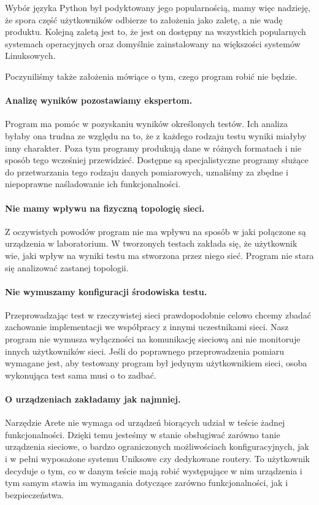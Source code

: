 \documentclass[00-praca-magisterska.tex]{subfiles}
\begin{document}
Wybór języka Python był podyktowany jego popularnością, mamy więc nadzieję, że
spora część użytkowników odbierze to założenia jako zaletę, a nie wadę
produktu. Kolejną zaletą jest to, że jest on dostępny na wszystkich popularnych
systemach operacyjnych oraz domyślnie zainstalowany na większości systemów
Linuksowych.

Poczyniliśmy także założenia mówiące o tym, czego program robić nie będzie.

\paragraph{Analizę wyników pozostawiamy ekspertom.} Program ma pomóc w
pozyskaniu wyników określonych testów. Ich analiza byłaby ona trudna ze
względu na to, że z każdego rodzaju testu wyniki miałyby inny charakter. Poza
tym programy produkują dane w różnych formatach i nie sposób tego wcześniej
przewidzieć. Dostępne są specjalistyczne programy służące do przetwarzania tego
rodzaju danych pomiarowych, uznaliśmy za zbędne i niepoprawne naśladowanie ich
funkcjonalności.

\paragraph{Nie mamy wpływu na fizyczną topologię sieci.} Z oczywistych powodów
program nie ma wpływu na sposób w jaki połączone są urządzenia w laboratorium. W
tworzonych testach zakłada się, że użytkownik wie, jaki wpływ na wyniki testu ma
stworzona przez niego sieć. Program nie stara się analizować zastanej topologii.

\paragraph{Nie wymuszamy konfiguracji środowiska testu.} Przeprowadzając test w
rzeczywistej sieci prawdopodobnie celowo chcemy zbadać zachowanie implementacji
we współpracy z innymi uczestnikami sieci. Nasz program nie wymusza wyłączności
na komunikację sieciową ani nie monitoruje innych użytkowników sieci. Jeśli do
poprawnego przeprowadzenia pomiaru wymagane jest, aby testowany program był
jedynym użytkownikiem sieci, osoba wykonująca test sama musi o to zadbać.

\paragraph{O urządzeniach zakładamy jak najmniej.} Narzędzie Arete nie
wymaga od urządzeń biorących udział w teście żadnej funkcjonalności.
Dzięki temu jesteśmy w stanie obsługiwać zarówno tanie urządzenia sieciowe, o
bardzo ograniczonych możliwościach konfiguracyjnych, jak i w pełni wyposażone
systemu Uniksowe czy dedykowane routery. To użytkownik decyduje o tym, co w
danym teście mają robić występujące w nim urządzenia i tym samym stawia
im wymagania dotyczące zarówno funkcjonalności, jak i bezpieczeństwa.
\end{document}
